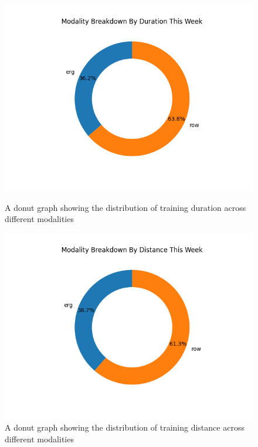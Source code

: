 \begin{figure}[htbp]
  \centering
  \begin{minipage}[c]{0.45\linewidth}
    \centering
    \includegraphics[width=\linewidth]{figures/durationDonut.png}
    \captionsetup{justification=centering}
    \caption[Duration Donut]{\label{fig:durationDonut}A donut graph showing the distribution of training duration across different modalities}
  \end{minipage}
  \begin{minipage}[c]{0.45\linewidth}
    \centering
    \includegraphics[width=\linewidth]{figures/distanceDonut.png}
    \captionsetup{justification=centering}
    \caption[Distance Donut]{\label{fig:distanceDonut}A donut graph showing the distribution of training distance across different modalities}
  \end{minipage}
\end{figure}
